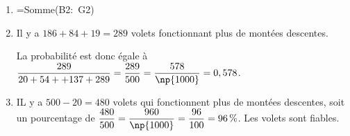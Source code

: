 \documentclass[10pt]{article}
\begin{document}
\begin{enumerate}
\item  %
=Somme(B2:~G2)
\item  %
Il y a $186 + 84 + 19 = 289$ volets fonctionnant plus de  montées descentes.

La probabilité est donc égale à $\dfrac{289}{20 + 54 + + 137 + 289} = \dfrac{289}{500} = \dfrac{578}{\np{1000}} = 0,578$.
\item  %
IL y a $500 - 20 = 480$ volets qui fonctionnent plus de  montées descentes, soit un pourcentage de $\dfrac{480}{500} = \dfrac{960}{\np{1000}} = \dfrac{96}{100} = 96\,\%$. Les volets sont fiables.
\end{enumerate}

\bigskip
\end{document}
